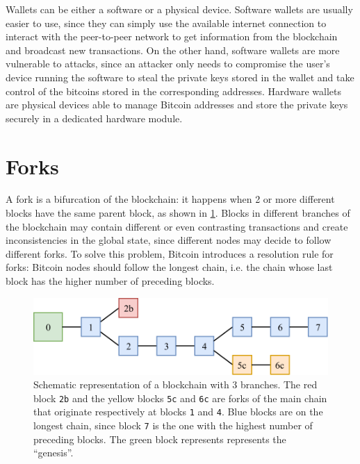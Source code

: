 Wallets can be either a software or a physical device.
Software wallets are usually easier to use, since they can simply use the available internet connection to interact with the peer-to-peer network to get information from the blockchain and broadcast new transactions.
On the other hand, software wallets are more vulnerable to attacks, since an attacker only needs to compromise the user's device running the software to steal the private keys stored in the wallet and take control of the bitcoins stored in the corresponding addresses.
Hardware wallets are physical devices able to manage Bitcoin addresses and store the private keys securely in a dedicated hardware module.

\section{Forks}
A fork is a bifurcation of the blockchain:
it happens when \num{2} or more different blocks have the same parent block, as shown in \cref{fig:forks}.
Blocks in different branches of the blockchain may contain different or even contrasting transactions and create inconsistencies in the global state, since different nodes may decide to follow different forks.
To solve this problem, Bitcoin introduces a resolution rule for forks:
Bitcoin nodes should follow the longest chain, i.e. the chain whose last block has the higher number of preceding blocks.

\begin{figure}[h]
	\centering
	\vspace*{0.25cm}
	\includegraphics[scale=0.8]{figures/forks}
	\vspace*{0.25cm}
	\caption{
		Schematic representation of a blockchain with \num{3} branches.
		The red block \texttt{2b} and the yellow blocks \texttt{5c} and \texttt{6c} are forks of the main chain that originate respectively at blocks \texttt{1} and \texttt{4}.
		Blue blocks are on the longest chain, since block \texttt{7} is the one with the highest number of preceding blocks.
		The green block represents represents the ``genesis''.
	}
	\label{fig:forks}
\end{figure}

